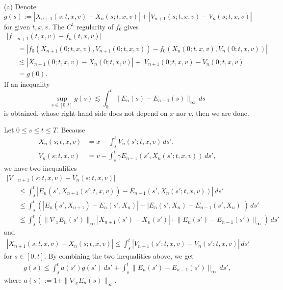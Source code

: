 \documentclass[12pt]{article}
\begin{document}
\begin{pf}
(a)
Denote
\[g(s):=|X_{n+1}(s;t,x,v)-X_n(s;t,x,v)|+|V_{n+1}(s;t,x,v)-V_n(s;t,x,v)|\]
for given $t,x,v$.
The $C^1$ regularity of $f_0$ gives
\begin{align*}
|f&_{n+1}(t,x,v)-f_n(t,x,v)|\\
&=|f_0(X_{n+1}(0;t,x,v),V_{n+1}(0;t,x,v))-f_0(X_n(0;t,x,v),V_n(0;t,x,v))|\\
&\lesssim|X_{n+1}(0;t,x,v)-X_n(0;t,x,v)|+|V_{n+1}(0;t,x,v)-V_n(0;t,x,v)|\\
&=g(0).
\end{align*}
If an inequality
\[\sup_{s\in[0,t]}g(s)\lesssim\int_0^t\|E_n(s)-E_{n-1}(s)\|_\infty\,ds\]
is obtained, whose right-hand side does not depend on $x$ nor $v$, then we are done.

Let $0\le s\le t\le T$.
Because
\begin{align*}
X_n(s;t,x,v)&=x-\int_s^tV_n(s';t,x,v)\,ds',\\
V_n(s;t,x,v)&=v-\int_s^t\gamma E_{n-1}(s',X_n(s';t,x,v))\,ds',
\end{align*}
we have two inequalities
\begin{align*}
|V&_{n+1}(s;t,x,v)-V_n(s;t,x,v)|\\
&\le\int_s^t|E_n(s',X_{n+1}(s';t,x,v))-E_{n-1}(s',X_n(s';t,x,v))|\,ds'\\
&\le\int_s^t(|E_n(s',X_{n+1})-E_n(s',X_n)|+|E_n(s',X_n)-E_{n-1}(s',X_n)|)\,ds'\\
&\le\int_s^t(\|\nabla_xE_n(s')\|_\infty|X_{n+1}(s')-X_n(s')|+\|E_n(s')-E_{n-1}(s')\|_\infty)\,ds'
\end{align*}
and
\begin{align*}
|X_{n+1}(s;t,x,v)-X_n(s;t,x,v)|\le\int_s^t|V_{n+1}(s';t,x,v)-V_n(s';t,x,v)|\,ds'
\end{align*}
for $s\in[0,t]$.
By combining the two inequalities above, we get
\begin{align}\label{ggw}
g(s)\le\int_s^ta(s')g(s')\,ds'+\int_s^t\|E_n(s')-E_{n-1}(s')\|_\infty\,ds',
\end{align}
where $a(s):=1+\|\nabla_xE_n(s)\|_\infty$.


\end{pf}
\end{document}
